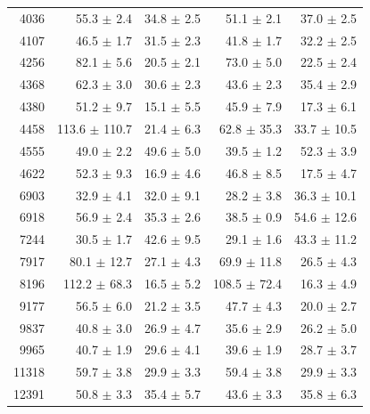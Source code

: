 \begin{table}
{\begin{tabular}{|r r r r r|}
 4036 &  55.3 $\pm$   2.4 & 34.8 $\pm$  2.5 &    51.1 $\pm$  2.1 & 37.0 $\pm$  2.5  \\
 4107 &  46.5 $\pm$   1.7 & 31.5 $\pm$  2.3 &    41.8 $\pm$  1.7 & 32.2 $\pm$  2.5  \\
 4256 &  82.1 $\pm$   5.6 & 20.5 $\pm$  2.1 &    73.0 $\pm$  5.0 & 22.5 $\pm$  2.4  \\
 4368 &  62.3 $\pm$   3.0 & 30.6 $\pm$  2.3 &    43.6 $\pm$  2.3 & 35.4 $\pm$  2.9  \\
 4380 &  51.2 $\pm$   9.7 & 15.1 $\pm$  5.5 &    45.9 $\pm$  7.9 & 17.3 $\pm$  6.1  \\
 4458 & 113.6 $\pm$ 110.7 & 21.4 $\pm$  6.3 &    62.8 $\pm$ 35.3 & 33.7 $\pm$ 10.5  \\
 4555 &  49.0 $\pm$   2.2 & 49.6 $\pm$  5.0 &    39.5 $\pm$  1.2 & 52.3 $\pm$  3.9  \\
 4622 &  52.3 $\pm$   9.3 & 16.9 $\pm$  4.6 &    46.8 $\pm$  8.5 & 17.5 $\pm$  4.7  \\
 6903 &  32.9 $\pm$   4.1 & 32.0 $\pm$  9.1 &    28.2 $\pm$  3.8 & 36.3 $\pm$ 10.1  \\
 6918 &  56.9 $\pm$   2.4 & 35.3 $\pm$  2.6 &    38.5 $\pm$  0.9 & 54.6 $\pm$ 12.6  \\
 7244 &  30.5 $\pm$   1.7 & 42.6 $\pm$  9.5 &    29.1 $\pm$  1.6 & 43.3 $\pm$ 11.2  \\
 7917 &  80.1 $\pm$  12.7 & 27.1 $\pm$  4.3 &    69.9 $\pm$ 11.8 & 26.5 $\pm$  4.3  \\
 8196 & 112.2 $\pm$  68.3 & 16.5 $\pm$  5.2 &   108.5 $\pm$ 72.4 & 16.3 $\pm$  4.9  \\
 9177 &  56.5 $\pm$   6.0 & 21.2 $\pm$  3.5 &    47.7 $\pm$  4.3 & 20.0 $\pm$  2.7  \\
 9837 &  40.8 $\pm$   3.0 & 26.9 $\pm$  4.7 &    35.6 $\pm$  2.9 & 26.2 $\pm$  5.0  \\
 9965 &  40.7 $\pm$   1.9 & 29.6 $\pm$  4.1 &    39.6 $\pm$  1.9 & 28.7 $\pm$  3.7  \\
11318 &  59.7 $\pm$   3.8 & 29.9 $\pm$  3.3 &    59.4 $\pm$  3.8 & 29.9 $\pm$  3.3  \\
12391 &  50.8 $\pm$   3.3 & 35.4 $\pm$  5.7 &    43.6 $\pm$  3.3 & 35.8 $\pm$  6.3  \\
\hline
\end{tabular}
}
%
\end{table}
